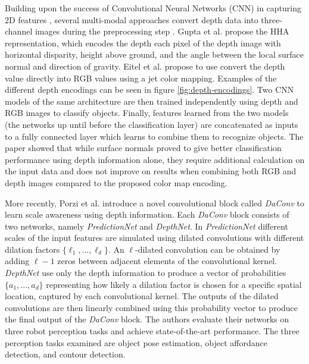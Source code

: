 Building upon the success of Convolutional Neural Networks (CNN) in capturing 2D features \cite{Gu2018}, several
multi-modal approaches convert depth data into three-channel images during the preprocessing step
\cite{Eitel2015,Gupta2014RGBDFeatures}. Gupta et al. \cite{Gupta2014RGBDFeatures} propose the HHA representation, which
encodes the depth each pixel of the depth image with horizontal disparity, height above ground, and the angle between
the local surface normal and direction of gravity. Eitel et al. \cite{Eitel2015} propose to use convert the depth value
directly into RGB values using a jet color mapping. Examples of the different depth encodings can be seen in figure
\ref{fig:depth-encodings}. Two CNN models of the same architecture are then trained independently using depth and RGB
images to classify objects. Finally, features learned from the two models (the networks up until before the
classification layer) are concatenated as inputs to a fully connected layer which learns to combine them to recognize
objects. The paper showed that while surface normals proved to give better classification performance using depth
information alone, they require additional calculation on the input data and does not improve on results when combining
both RGB and depth images compared to the proposed color map encoding.

More recently, Porzi et al. \cite{Porzi2017} introduce a novel convolutional block called \emph{DaConv} to learn scale
awareness using depth information. Each \emph{DaConv} block consists of two networks, namely \emph{PredictionNet} and
\emph{DepthNet}. In \emph{PredictionNet} different scales of the input features are simulated using dilated convolutions
\cite{YuKoltun2016} with different dilation factors $ \{ \ell_1,...,\ell_d \} $. An $ \ell $-dilated convolution can be
obtained by adding $ \ell - 1 $ zeros between adjacent elements of the convolutional kernel. \emph{DepthNet} use only
the depth information to produce a vector of probabilities $ \{ a_1,...,a_d \} $ representing how likely a dilation
factor is chosen for a specific spatial location, captured by each convolutional kernel. The outputs of the dilated
convolutions are then linearly combined using this probability vector to produce the final output of the \emph{DaConv}
block. The authors evaluate their networks on three robot perception tasks and achieve state-of-the-art performance. The
three perception tasks examined are object pose estimation, object affordance detection, and contour detection.

